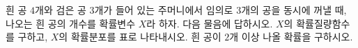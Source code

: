 흰 공 $4$개와 검은 공 $3$개가 들어 있는 주머니에서 임의로 $3$개의 공을 동시에 꺼낼 때, 나오는 흰 공의 개수를 확률변수 $X$라 하자. 다음 물음에 답하시오.
 $X$의 확률질량함수를 구하고, $X$의 확률분포를 표로 나타내시오.
 흰 공이 $2$개 이상 나올 확률을 구하시오.
